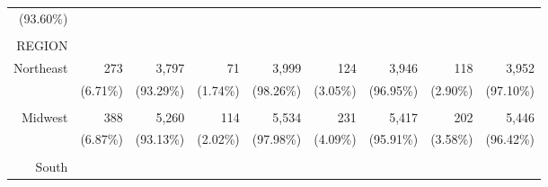 \documentclass{article}
\begin{document}
\begin{tabular}{lllllllll}
  \multicolumn{1}{r}{(93.60\%)} \\
\multicolumn{1}{r}{} &
  \multicolumn{1}{|r}{} &
  \multicolumn{1}{r}{} &
  \multicolumn{1}{r}{} &
  \multicolumn{1}{r}{} &
  \multicolumn{1}{r}{} &
  \multicolumn{1}{r}{} &
  \multicolumn{1}{r}{} &
  \multicolumn{1}{r}{} \\
\multicolumn{1}{r}{REGION} &
  \multicolumn{1}{|r}{} &
  \multicolumn{1}{r}{} &
  \multicolumn{1}{r}{} &
  \multicolumn{1}{r}{} &
  \multicolumn{1}{r}{} &
  \multicolumn{1}{r}{} &
  \multicolumn{1}{r}{} &
  \multicolumn{1}{r}{} \\
\multicolumn{1}{r}{Northeast\hspace{1em}} &
  \multicolumn{1}{|r}{273} &
  \multicolumn{1}{r}{3,797} &
  \multicolumn{1}{r}{71} &
  \multicolumn{1}{r}{3,999} &
  \multicolumn{1}{r}{124} &
  \multicolumn{1}{r}{3,946} &
  \multicolumn{1}{r}{118} &
  \multicolumn{1}{r}{3,952} \\
\multicolumn{1}{r}{} &
  \multicolumn{1}{|r}{(6.71\%)} &
  \multicolumn{1}{r}{(93.29\%)} &
  \multicolumn{1}{r}{(1.74\%)} &
  \multicolumn{1}{r}{(98.26\%)} &
  \multicolumn{1}{r}{(3.05\%)} &
  \multicolumn{1}{r}{(96.95\%)} &
  \multicolumn{1}{r}{(2.90\%)} &
  \multicolumn{1}{r}{(97.10\%)} \\
\multicolumn{1}{r}{} &
  \multicolumn{1}{|r}{} &
  \multicolumn{1}{r}{} &
  \multicolumn{1}{r}{} &
  \multicolumn{1}{r}{} &
  \multicolumn{1}{r}{} &
  \multicolumn{1}{r}{} &
  \multicolumn{1}{r}{} &
  \multicolumn{1}{r}{} \\
\multicolumn{1}{r}{Midwest\hspace{1em}} &
  \multicolumn{1}{|r}{388} &
  \multicolumn{1}{r}{5,260} &
  \multicolumn{1}{r}{114} &
  \multicolumn{1}{r}{5,534} &
  \multicolumn{1}{r}{231} &
  \multicolumn{1}{r}{5,417} &
  \multicolumn{1}{r}{202} &
  \multicolumn{1}{r}{5,446} \\
\multicolumn{1}{r}{} &
  \multicolumn{1}{|r}{(6.87\%)} &
  \multicolumn{1}{r}{(93.13\%)} &
  \multicolumn{1}{r}{(2.02\%)} &
  \multicolumn{1}{r}{(97.98\%)} &
  \multicolumn{1}{r}{(4.09\%)} &
  \multicolumn{1}{r}{(95.91\%)} &
  \multicolumn{1}{r}{(3.58\%)} &
  \multicolumn{1}{r}{(96.42\%)} \\
\multicolumn{1}{r}{} &
  \multicolumn{1}{|r}{} &
  \multicolumn{1}{r}{} &
  \multicolumn{1}{r}{} &
  \multicolumn{1}{r}{} &
  \multicolumn{1}{r}{} &
  \multicolumn{1}{r}{} &
  \multicolumn{1}{r}{} &
  \multicolumn{1}{r}{} \\
\multicolumn{1}{r}{South\hspace{1em}} &

\end{tabular}
\end{document}
